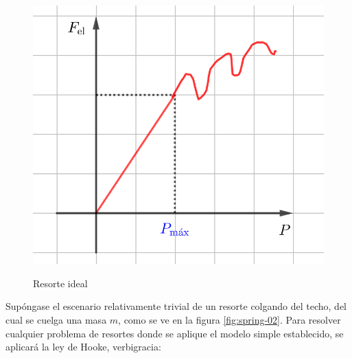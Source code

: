 \documentclass{article}
\begin{document}
\begin{figure}[ht]
\centering
\caption{Resorte ideal}
\includegraphics[scale=0.8]{../../common/img/62.01/theory/15-dynamics-spring-01.png}
\label{fig:spring-01}
\end{figure}

Supóngase el escenario relativamente trivial de un resorte colgando del techo, del cual se cuelga una masa $m$, como se ve en la figura \ref{fig:spring-02}. Para resolver cualquier problema de resortes donde se aplique el modelo simple establecido, se aplicará la ley de Hooke, verbigracia:
\end{document}
